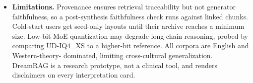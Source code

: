 \documentclass[paper=a4, fontsize=11pt]{scrartcl}
\begin{document}
\begin{itemize}
  \item \textbf{Limitations.} Provenance ensures retrieval traceability
  but not generator faithfulness, so a post-synthesis faithfulness check
  runs against linked chunks. Cold-start users get seed-only layouts
  until their archive reaches a minimum size. Low-bit MoE quantization
  may degrade long-chain reasoning, probed by comparing UD-IQ4\_XS to a
  higher-bit reference. All corpora are English and Western-theory-
  dominated, limiting cross-cultural generalization. DreamRAG is a
  research prototype, not a clinical tool, and renders disclaimers on
  every interpretation card.
\end{itemize}
\end{document}
